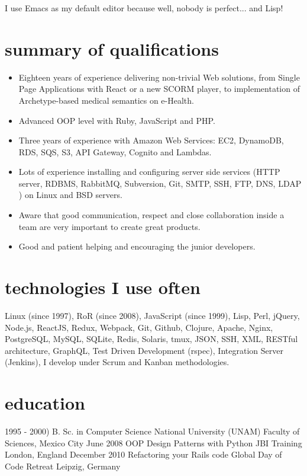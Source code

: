 \documentclass[]{k-cv}
\begin{document}
I use Emacs as my default editor because well, nobody is perfect... and Lisp!

\section{summary of qualifications}
  \begin{itemize}
    \item Eighteen years of experience delivering non-trivial Web solutions, from Single Page Applications
          with React or a new SCORM player, to implementation of Archetype-based medical semantics on e-Health.
    \item Advanced OOP level with Ruby, JavaScript and PHP.
    \item Three years of experience with Amazon Web Services: EC2, DynamoDB, RDS, SQS, S3, API Gateway, Cognito and Lambdas.
    \item Lots of experience installing and configuring server side services (HTTP server,
          RDBMS, RabbitMQ, Subversion, Git, SMTP, SSH, FTP, DNS, LDAP ) on Linux and
          BSD servers.
    \item Aware that good communication, respect and close collaboration inside a team
          are very important to create great products.
    \item Good and patient helping and encouraging the junior developers.
   \end{itemize}

\section{technologies I use often}

    Linux (since 1997), RoR (since 2008), JavaScript (since 1999), Lisp, Perl, jQuery, Node.js, ReactJS, Redux, Webpack, Git,
    Github, Clojure, Apache, Nginx, PostgreSQL, MySQL, SQLite, Redis, Solaris,
    tmux, JSON, SSH, XML, RESTful architecture, GraphQL, Test Driven Development (rspec),
    Integration Server (Jenkins), I develop under Scrum and Kanban methodologies.

\section{education}

\begin{entrylist}
  \entry
    {1995 - 2000)}
    {B. Sc. in Computer Science}
    {National University (UNAM)}
	  {Faculty of Sciences, Mexico City}
  \entry
    {June 2008}
    {OOP Design Patterns with Python}
    {JBI Training}
    {London, England}
   \entry
    {December 2010}
    {Refactoring your Rails code}
    {Global Day of Code Retreat}
    {Leipzig, Germany}

\end{entrylist}
\end{document}
